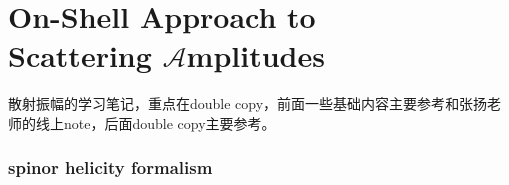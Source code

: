 \part{On-Shell Approach to \\
	Scattering $\mathcal{A}$mplitudes}
\setcounter{theorem}{0}
\setcounter{definition}{0}
\setcounter{lemma}{0}
\setcounter{sidenote}{1}

散射振幅的学习笔记，重点在double copy，前面一些基础内容主要参考\cite{Elvang:2015rqa}和张扬老师的线上note，后面double copy主要参考\cite{Carrasco:2015iwa,Bern:2019prr,Bern:2022wqg}。
\section{spinor helicity formalism}